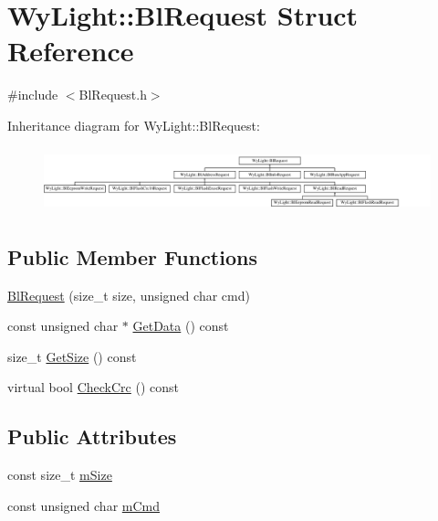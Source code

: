 \hypertarget{struct_wy_light_1_1_bl_request}{\section{Wy\-Light\-:\-:Bl\-Request Struct Reference}
\label{struct_wy_light_1_1_bl_request}
}


{\ttfamily \#include $<$Bl\-Request.\-h$>$}

Inheritance diagram for Wy\-Light\-:\-:Bl\-Request\-:\begin{figure}[H]
\begin{center}
\leavevmode
\includegraphics[height=1.885522cm]{struct_wy_light_1_1_bl_request}
\end{center}
\end{figure}
\subsection*{Public Member Functions}
\begin{DoxyCompactItemize}
\item 
\hyperlink{struct_wy_light_1_1_bl_request_a4a851665f3b0c945c63023f0d30f909c}{Bl\-Request} (size\-\_\-t size, unsigned char cmd)
\item 
const unsigned char $\ast$ \hyperlink{struct_wy_light_1_1_bl_request_a0d956ad98677f0d309c031d00d797f90}{Get\-Data} () const 
\item 
size\-\_\-t \hyperlink{struct_wy_light_1_1_bl_request_a46864fa4524fcdd0f32033e8f51ba1c5}{Get\-Size} () const 
\item 
virtual bool \hyperlink{struct_wy_light_1_1_bl_request_a35e6aeaab96cce48c4dcc2f63eb920c4}{Check\-Crc} () const 
\end{DoxyCompactItemize}
\subsection*{Public Attributes}
\begin{DoxyCompactItemize}
\item 
const size\-\_\-t \hyperlink{struct_wy_light_1_1_bl_request_afa34d5447875f08e32d1a8b1de10685f}{m\-Size}
\item 
const unsigned char \hyperlink{struct_wy_light_1_1_bl_request_a8d9f248e23c6e940bf6c23f9bdbcbb37}{m\-Cmd}
\end{DoxyCompactItemize}


